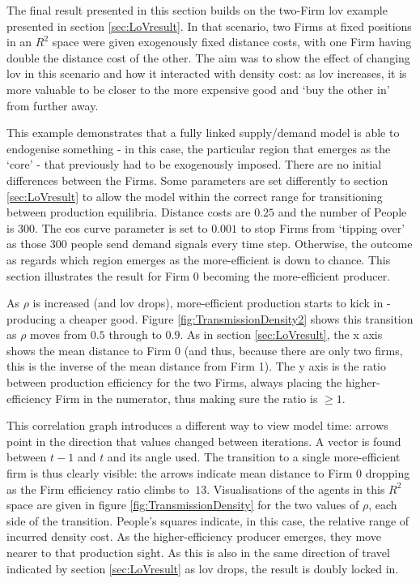 The final result presented in this section builds on the two-Firm \gls{lov} example presented in section \ref{sec:LoVresult}. In that scenario, two Firms at fixed positions in an $R^2$ space were given exogenously fixed distance costs, with one Firm having double the distance cost of the other. The aim was to show the effect of changing \gls{lov} in this scenario and how it interacted with density cost: as \gls{lov} increases, it is more valuable to be closer to the more expensive good and `buy the other in' from further away. 

This example demonstrates that a fully linked supply/demand model is able to endogenise something  - in this case, the particular region that emerges as the `core' - that previously had to be exogenously imposed. There are no initial differences between the Firms. Some parameters are set differently to section \ref{sec:LoVresult} to allow the model within the correct range for transitioning between production equilibria. Distance costs are $0.25$ and the number of People is $300$. The \gls{eos} curve parameter is set to $0.001$ to stop Firms from `tipping over' as those $300$ people send demand signals every time step. Otherwise, the outcome as regards which region emerges as the more-efficient is down to chance. This section illustrates the result for Firm 0 becoming the more-efficient producer.

As $\rho$ is increased (and \gls{lov} drops), more-efficient production starts to kick in - producing a cheaper good. Figure \ref{fig:TransmissionDensity2} shows this transition as $\rho$ moves from $0.5$ through to $0.9$. As in section \ref{sec:LoVresult}, the x axis shows the mean distance to Firm $0$ (and thus, because there are only two firms, this is the inverse of the mean distance from Firm 1). The y axis is the ratio between production efficiency for the two Firms, always placing the higher-efficiency Firm in the numerator, thus making sure the ratio is $ \geqslant 1$. 

This correlation graph introduces a different way to view model time: arrows point in the direction that values changed between iterations. A vector is found between $t-1$ and $t$ and its angle used. The transition to a single more-efficient firm is thus clearly visible: the arrows indicate mean distance to Firm $0$ dropping as the Firm efficiency ratio climbs to $~13$. Visualisations of the agents in this $R^2$ space are given in figure \ref{fig:TransmissionDensity} for the two values of $\rho$, each side of the transition. People's squares indicate, in this case, the relative range of incurred density cost. As the higher-efficiency producer emerges, they move nearer to that production sight. As this is also in the same direction of travel indicated by section \ref{sec:LoVresult} as \gls{lov} drops, the result is doubly locked in.

